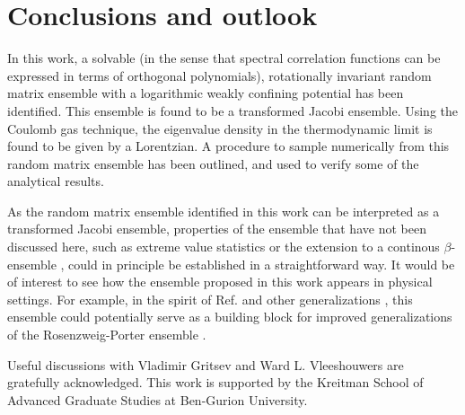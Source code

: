 \documentclass[aps, notitlepage, floatfix, pre, twocolumn]{revtex4-2}
\begin{document}
\section{Conclusions and outlook} \label{sec: conclusions}
In this work, a solvable (in the sense that spectral correlation functions can be expressed in terms of orthogonal polynomials), rotationally invariant random matrix ensemble with a logarithmic weakly confining potential has been identified. This ensemble is found to be a transformed Jacobi ensemble. Using the Coulomb gas technique, the eigenvalue density in the thermodynamic limit is found to be given by a Lorentzian. A procedure to sample numerically from this random matrix ensemble has been outlined, and used to verify some of the analytical results.

As the random matrix ensemble identified in this work can be interpreted as a transformed Jacobi ensemble, properties of the ensemble that have not been discussed here, such as extreme value statistics \cite{MorenoPozas19} or the extension to a continous $\beta$-ensemble \cite{Dumitriu02}, could in principle be established in a straightforward way. It would be of interest to see how the ensemble proposed in this work appears in physical settings. For example, in the spirit of Ref. \cite{Venturelli22} and other generalizations \cite{Khaymovich20, Biroli21, Khaymovich21, Buijsman22, DeTomasi22}, this ensemble could potentially serve as a building block for improved generalizations of the Rosenzweig-Porter ensemble \cite{Kravtsov15}.



\begin{acknowledgments}
Useful discussions with Vladimir Gritsev and Ward L. Vleeshouwers are gratefully acknowledged. This work is supported by the Kreitman School of Advanced Graduate Studies at Ben-Gurion University.
\end{acknowledgments}



\appendix*
\end{document}
